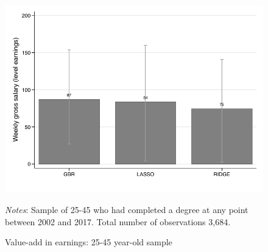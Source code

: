 \documentclass[12pt, a4paper]{article}
\begin{document}
\begin{figure}[htbp]
\centering
\caption{Value-add in earnings: 25-45 year-old sample}
\vspace{0.5cm}
  \label{fig:valadle46}
    \includegraphics{_figures/valad_levearn_46.pdf}
\parbox{1\textwidth}{\footnotesize{\textit{Notes}: Sample of 25-45 who had completed a degree at any point between 2002 and 2017. Total number of observations 3,684.}}
\end{figure}
\end{document}
